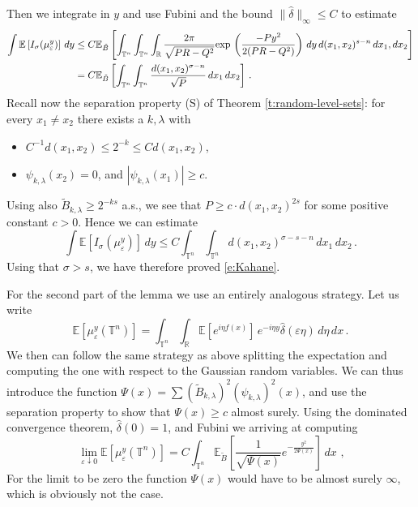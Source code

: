 \documentclass[11pt,reqno]{amsart}
\newcommand{\T}{{\mathbb T}}
\newcommand{\E}{{\mathbb E}}
\renewcommand{\exp}{{\rm exp}\,}
\theoremstyle{definition}
\numberwithin{equation}{section}
\begin{document}
Then we integrate in $y$ and use Fubini and the bound $\|\hat{\delta}\|_\infty \leq C$ to estimate
\begin{align*}
\int \mathbb E \left[I_\sigma (\mu^y_\varepsilon)\right]\, dy &
\leq C \mathbb E_{\tilde B} \left[\int_{\mathbb T^n} \int_{\mathbb T^n} \int_{\mathbb R} \frac{2\pi}{\sqrt{PR-Q^2}}\exp \left(\frac{-Py^2}{2(PR-Q^2)}\right) \, dy\,  d(x_1, x_2)^{s-n}\, dx_1, dx_2
\right]\\
&= C \mathbb E_{\tilde B} \left[ \int_{\mathbb T^n} \int_{\mathbb T^n} \frac{d(x_1, x_2)^{\sigma-n}}{\sqrt{P}} \, dx_1\, dx_2 \right]\, .
\end{align*}
Recall now the separation property (S) of Theorem \ref{t:random-level-sets}: for every $x_1\neq x_2$ there exists a $k,\lambda$ with 
\begin{itemize}
    \item $C^{-1} d (x_1, x_2) \leq 2^{-k} \leq C d(x_1,x_2)$,
    \item $\psi_{k,\lambda}(x_2)=0$,
    and $|\psi_{k,\lambda}(x_1)|\ge c$. 
\end{itemize}
Using also $\tilde{B}_{k,\lambda}\ge 2^{-ks}$ a.s., we see that $P \ge c\cdot d(x_1,x_2)^{2s}$ for some positive constant $c>0$. Hence we can estimate
\[
\int \mathbb E \left[I_\sigma (\mu^y_\varepsilon)\right]\, dy
\leq  C \int_{\mathbb T^n} \int_{\mathbb T^n} d(x_1, x_2)^{\sigma-s-n}\, dx_1\, dx_2\, .
\]
Using that $\sigma>s$, we have therefore proved \eqref{e:Kahane}.

\medskip

For the second part of the lemma we use an entirely analogous strategy. Let us write 
\[
\mathbb E \left[\mu^y_\varepsilon (\mathbb T^n)\right]
= \int_{\T^n} \int_{\mathbb R} \mathbb E \left[ e^{i\eta f(x)}\right]\, e^{-i\eta y}\hat{\delta} (\varepsilon \eta) \, d\eta\, dx\, .
\]
We then can follow the same strategy as above splitting the expectation and computing the one with respect to the Gaussian random variables. We can thus introduce the function
$\Psi(x)=\sum (\tilde{B}_{k,\lambda})^2(\psi_{k,\lambda})^2(x)$, and use the separation property to show that $\Psi (x) \geq c$ almost surely. Using the dominated convergence theorem, $\hat{\delta} (0) =1$, and Fubini we arriving at computing  
\[\
\lim_{\varepsilon\downarrow 0}\E[\mu^y_\varepsilon(\T^n)] = C \int_{\T^n}\E_{\tilde{B}}\left[\frac{1}{\sqrt{\Psi(x)}}e^{-\frac{y^2}{2\Psi(x)}}\right]\,dx\, \, ,
\]
For the limit to be zero the function $\Psi (x)$ would have to be almost surely $\infty$, which is obviously not the case. 
\end{document}
